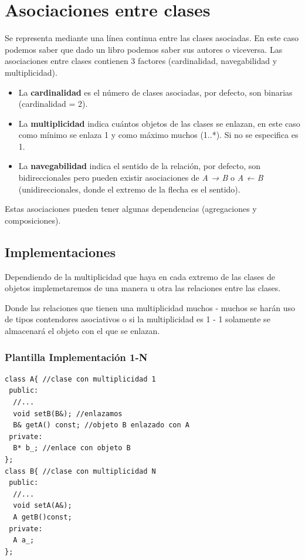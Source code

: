 \chapter{Asociaciones entre clases}


Se representa mediante una línea continua entre las clases asociadas.
En este caso podemos saber que dado un libro podemos saber sus autores o viceversa.
Las asociaciones entre clases contienen 3 factores (cardinalidad, navegabilidad y multiplicidad).
\begin{itemize}
	\item La \textbf{cardinalidad} es el número de clases asociadas, por defecto, son binarias (cardinalidad = 2).
	\item La \textbf{multiplicidad} indica cuántos objetos de las clases se enlazan, en este caso como mínimo se enlaza 1 y como máximo muchos (1..*). Si no se especifica es 1.
	\item La \textbf{navegabilidad} indica el sentido de la relación, por defecto, son bidireccionales pero pueden existir asociaciones de \textit{A → B} o \textit{A ← B} (unidireccionales, donde el extremo de la flecha es el sentido).
\end{itemize}
Estas asociaciones pueden tener algunas dependencias (agregaciones y composiciones).
\section{Implementaciones}
Dependiendo de la multiplicidad que haya en cada extremo de las clases de objetos implemetaremos de una manera u 
otra las relaciones entre las clases.

Donde las relaciones que tienen una multiplicidad muchos - muchos se harán uso de tipos contendores asociativos o si la 
multiplicidad es 1 - 1 solamente se almacenará el objeto con el que se enlazan.

\subsection{Plantilla Implementación 1-N}
\begin{center}
\begin{lstlisting}[frame=single]
class A{ //clase con multiplicidad 1
 public:
  //...
  void setB(B&); //enlazamos
  B& getA() const; //objeto B enlazado con A
 private:
  B* b_; //enlace con objeto B
};
class B{ //clase con multiplicidad N
 public:
  //...
  void setA(A&);
  A getB()const;
 private:
  A a_;
};
\end{lstlisting}
\end{center}
\newpage
